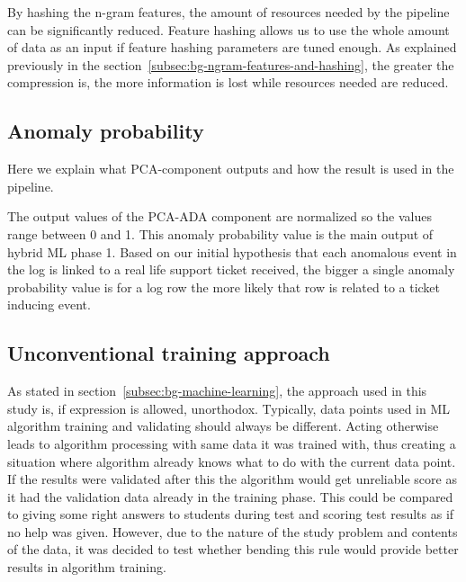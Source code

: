 By hashing the n-gram features,
the amount of resources needed by the pipeline
can be significantly reduced.
Feature hashing allows us to use the whole amount of data as an input
if feature hashing parameters are tuned enough.
As explained previously in the section~\ref{subsec:bg-ngram-features-and-hashing},
the greater the compression is,
the more information is lost
while resources needed are reduced.





%



\subsection{Anomaly probability}\label{subsec:pipe-anomaly-probability}
\begin{itcomment}
    Here we explain what PCA-component outputs and how the result is used in the pipeline.
\end{itcomment}

The output values of the PCA-ADA component are
normalized so the values range between 0 and 1.
This anomaly probability value
is the main output of hybrid ML phase 1.
Based on our initial hypothesis
that each anomalous event in the log
is linked to a real life support ticket received,
the bigger a single anomaly probability value is for a log row
the more likely that row is related to a ticket inducing event.




\subsection{Unconventional training approach}\label{subsec:pipe-unconventional-training}

As stated in section~\ref{subsec:bg-machine-learning},
the approach used in this study is,
if expression is allowed, unorthodox.
Typically,
data points used in ML algorithm training and validating
should always be different.
Acting otherwise leads to algorithm processing with
same data it was trained with,
thus creating a situation
where algorithm already knows what to do with the current data point.
If the results were validated after this
the algorithm would get unreliable score
as it had the validation data already in the training phase.
This could be compared to
giving some right answers to students during test
and scoring test results as if no help was given.
However,
due to the nature of the study problem and contents of the data,
it was decided to test whether bending this rule
would provide better results in algorithm training.

